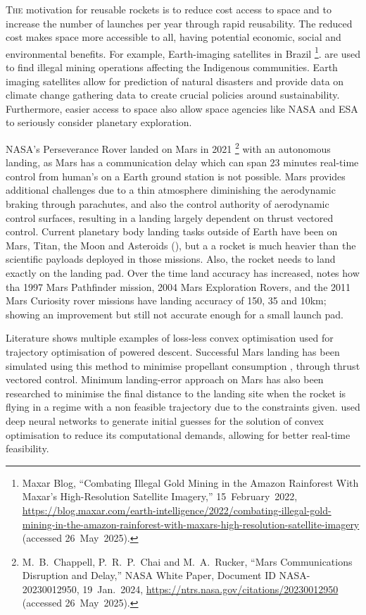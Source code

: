 \lettrine{T}{he} motivation for reusable rockets is to reduce cost access to space and to increase the number of launches per year through rapid reusability. The reduced cost makes space more accessible to all, having potential economic, social and environmental benefits. For example, Earth-imaging satellites in Brazil \footnote{Maxar Blog, ``Combating Illegal Gold Mining in the Amazon Rainforest With Maxar's High-Resolution Satellite Imagery,'' 15~February~2022, \url{https://blog.maxar.com/earth-intelligence/2022/combating-illegal-gold-mining-in-the-amazon-rainforest-with-maxars-high-resolution-satellite-imagery} (accessed 26~May~2025).}. are used to find illegal mining operations affecting the Indigenous communities. Earth imaging satellites allow for prediction of natural disasters and provide data on climate change gathering data to create crucial policies around sustainability. Furthermore, easier access to space also allow space agencies like NASA and ESA to seriously consider planetary exploration.

NASA's Perseverance Rover landed on Mars in 2021 \footnote{M.~B.~Chappell, P.~R.~P.~Chai and M.~A.~Rucker, 
  ``Mars Communications Disruption and Delay,'' NASA White Paper, 
  Document ID NASA-20230012950, 19~Jan.~2024, 
  \url{https://ntrs.nasa.gov/citations/20230012950} (accessed 26~May~2025).}
with an autonomous landing, as Mars has a communication delay which can span 23 minutes real-time control from human's on a Earth ground station is not possible. Mars provides additional challenges due to a thin atmosphere diminishing the aerodynamic braking through parachutes, and also the control authority of aerodynamic control surfaces, resulting in a landing largely dependent on thrust vectored control. Current planetary body landing tasks outside of Earth have been on Mars, Titan, the Moon and Asteroids (\cite{Blackmore2016}), but a a rocket is much heavier than the scientific payloads deployed in those missions. Also, the rocket needs to land exactly on the landing pad. Over the time land accuracy has increased, \cite{Acikmese2007} notes how tha 1997 Mars Pathfinder mission, 2004 Mars Exploration Rovers, and the 2011 Mars Curiosity rover missions have landing accuracy of 150, 35 and 10km; showing an improvement but still not accurate enough for a small launch pad.

Literature shows multiple examples of loss-less convex optimisation used for trajectory optimisation of powered descent. Successful Mars landing has been simulated using this method to minimise propellant consumption \cite{Acikmese2007}, \cite{Acikmese2013} through thrust vectored control. Minimum landing-error approach on Mars has also been researched \cite{Blackmore2010} to minimise the final distance to the landing site when the rocket is flying in a regime with a non feasible trajectory due to the constraints given. \cite{shen2022realtime} used deep neural networks to generate initial guesses for the solution of convex optimisation to reduce its computational demands, allowing for better real-time feasibility.

